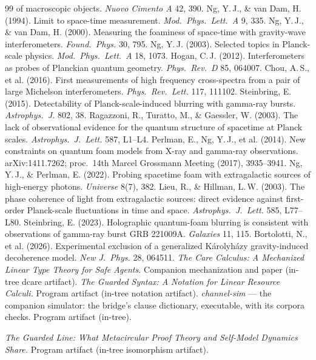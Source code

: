 \documentclass[11pt]{article}
\begin{document}
\begin{thebibliography}{99}
  of macroscopic objects. \emph{Nuovo Cimento A} 42, 390.
 Ng, Y.\,J., \& van Dam, H. (1994). Limit to space-time
  measurement. \emph{Mod.\ Phys.\ Lett.\ A} 9, 335.
 Ng, Y.\,J., \& van Dam, H. (2000). Measuring the foaminess
  of space-time with gravity-wave interferometers. \emph{Found.\ Phys.} 30, 795.
 Ng, Y.\,J. (2003). Selected topics in Planck-scale physics.
  \emph{Mod.\ Phys.\ Lett.\ A} 18, 1073.
 Hogan, C.\,J. (2012). Interferometers as probes of Planckian
  quantum geometry. \emph{Phys.\ Rev.\ D} 85, 064007.
 Chou, A.\,S., et al. (2016). First measurements of high
  frequency cross-spectra from a pair of large Michelson interferometers.
  \emph{Phys.\ Rev.\ Lett.} 117, 111102.
 Steinbring, E. (2015). Detectability of Planck-scale-induced
  blurring with gamma-ray bursts. \emph{Astrophys.\ J.} 802, 38.
 Ragazzoni, R., Turatto, M., \& Gaessler, W. (2003). The lack
  of observational evidence for the quantum structure of spacetime at Planck
  scales. \emph{Astrophys.\ J.\ Lett.} 587, L1--L4.
 Perlman, E., Ng, Y.\,J., et al. (2014). New constraints
  on quantum foam models from X-ray and gamma-ray observations.
  arXiv:1411.7262; proc.\ 14th Marcel Grossmann Meeting (2017), 3935--3941.
 Ng, Y.\,J., \& Perlman, E. (2022). Probing spacetime foam
  with extragalactic sources of high-energy photons. \emph{Universe} 8(7),
  382.
 Lieu, R., \& Hillman, L.\,W. (2003). The phase coherence of
  light from extragalactic sources: direct evidence against first-order
  Planck-scale fluctuations in time and space. \emph{Astrophys.\ J.\ Lett.}
  585, L77--L80.
 Steinbring, E. (2023). Holographic quantum-foam blurring is
  consistent with observations of gamma-ray burst GRB 221009A.
  \emph{Galaxies} 11, 115.
 Bortolotti, N., et al. (2026). Experimental exclusion of a
  generalized K\'arolyh\'azy gravity-induced decoherence model. \emph{New
  J.\ Phys.} 28, 064511.
 \emph{The Care Calculus: A Mechanized Linear Type Theory for
  Safe Agents.} Companion mechanization and paper (in-tree dcare artifact).
 \emph{The Guarded Syntax: A Notation for Linear Resource
  Calculi.} Program artifact (in-tree notation artifact).
 \emph{channel-sim} --- the companion simulator: the
  bridge's clause dictionary, executable, with its corpora checks. Program
  artifact (in-tree).

 \emph{The Guarded Line: What Metacircular Proof Theory and
  Self-Model Dynamics Share.} Program artifact (in-tree isomorphism
  artifact).
\end{thebibliography}
\end{document}
